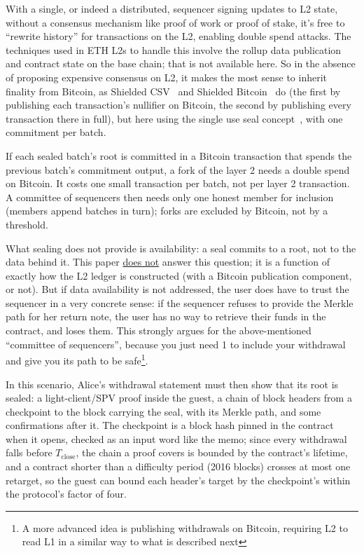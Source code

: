 \documentclass[11pt]{article}
\newcommand{\Tc}{T_{\mathrm{close}}}
\begin{document}
With a single, or indeed a distributed, sequencer signing updates to L2 state, without a consensus mechanism like proof of work or proof of stake, it's free to ``rewrite history'' for transactions on the L2, enabling double spend attacks. The techniques used in ETH L2s to handle this involve the rollup data publication and contract state on the base chain; that is not available here. So in the absence of proposing expensive consensus on L2, it makes the most sense to inherit finality from Bitcoin, as Shielded CSV~\cite{shieldedcsv} and Shielded Bitcoin~\cite{shieldedbtc} do (the first by publishing each transaction's nullifier on Bitcoin, the second by publishing every transaction there in full), but here using the single use seal concept~\cite{toddseals}, with one commitment per batch.

If each sealed batch's root is committed in a Bitcoin transaction that spends the previous batch's commitment output, a fork of the layer 2 needs a double spend on Bitcoin. It costs one small transaction per batch, not per layer 2 transaction. A committee of sequencers then needs only one honest member for inclusion (members append batches in turn); forks are excluded by Bitcoin, not by a threshold.

What sealing does not provide is availability: a seal commits to a root, not to the data behind it. This paper \underline{does not} answer this question; it is a function of exactly how the L2 ledger is constructed (with a Bitcoin publication component, or not). But if data availability is not addressed, the user does have to trust the sequencer in a very concrete sense: if the sequencer refuses to provide the Merkle path for her return note, the user has no way to retrieve their funds in the contract, and loses them. This strongly argues for the above-mentioned ``committee of sequencers'', because you just need 1 to include your withdrawal and give you its path to be safe\footnote{A more advanced idea is publishing withdrawals on Bitcoin, requiring L2 to read L1 in a similar way to what is described next}.

In this scenario, Alice's withdrawal statement must then show that its root is sealed: a light-client/SPV proof inside the guest, a chain of block headers from a checkpoint to the block carrying the seal, with its Merkle path, and some confirmations after it. The checkpoint is a block hash pinned in the contract when it opens, checked as an input word like the memo; since
every withdrawal falls before $\Tc$, the chain a proof covers is bounded by the contract's lifetime, and a contract shorter than a difficulty period (2016 blocks) crosses at most one retarget, so the guest can bound each header's target by the checkpoint's within the protocol's factor of four.
\end{document}
